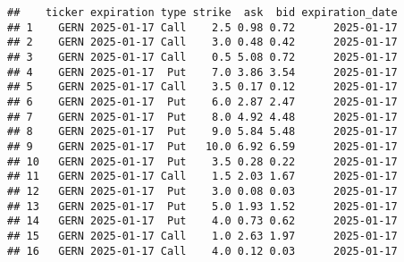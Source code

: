 \documentclass[
]{article}
\begin{document}
\begin{verbatim}
##    ticker expiration type strike  ask  bid expiration_date
## 1    GERN 2025-01-17 Call    2.5 0.98 0.72      2025-01-17
## 2    GERN 2025-01-17 Call    3.0 0.48 0.42      2025-01-17
## 3    GERN 2025-01-17 Call    0.5 5.08 0.72      2025-01-17
## 4    GERN 2025-01-17  Put    7.0 3.86 3.54      2025-01-17
## 5    GERN 2025-01-17 Call    3.5 0.17 0.12      2025-01-17
## 6    GERN 2025-01-17  Put    6.0 2.87 2.47      2025-01-17
## 7    GERN 2025-01-17  Put    8.0 4.92 4.48      2025-01-17
## 8    GERN 2025-01-17  Put    9.0 5.84 5.48      2025-01-17
## 9    GERN 2025-01-17  Put   10.0 6.92 6.59      2025-01-17
## 10   GERN 2025-01-17  Put    3.5 0.28 0.22      2025-01-17
## 11   GERN 2025-01-17 Call    1.5 2.03 1.67      2025-01-17
## 12   GERN 2025-01-17  Put    3.0 0.08 0.03      2025-01-17
## 13   GERN 2025-01-17  Put    5.0 1.93 1.52      2025-01-17
## 14   GERN 2025-01-17  Put    4.0 0.73 0.62      2025-01-17
## 15   GERN 2025-01-17 Call    1.0 2.63 1.97      2025-01-17
## 16   GERN 2025-01-17 Call    4.0 0.12 0.03      2025-01-17
\end{verbatim}
\end{document}
